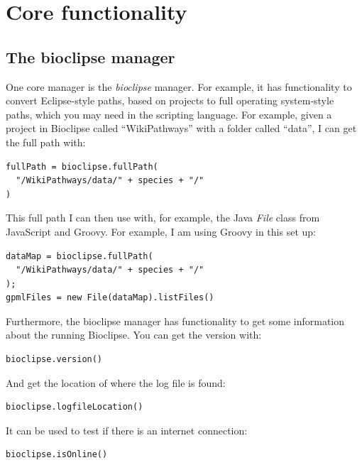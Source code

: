 \documentclass{book}
\begin{document}
\chapter{Core functionality}
\begin{refsection}

\section{The bioclipse manager}

One core manager is the \emph{bioclipse} manager. 
For example, it has functionality to convert Eclipse-style paths, based
on projects to full operating system-style paths, which you may
need in the scripting language. For example, given a project in
Bioclipse called ``WikiPathways'' with a folder called ``data'', I
can get the full path with:

\begin{Verbatim}
fullPath = bioclipse.fullPath(
  "/WikiPathways/data/" + species + "/"
)
\end{Verbatim}

This full path I can then use with, for example, the Java
\emph{File} class from JavaScript and Groovy. For example,
I am using Groovy in this set up:

\begin{Verbatim}
dataMap = bioclipse.fullPath(
  "/WikiPathways/data/" + species + "/"
);
gpmlFiles = new File(dataMap).listFiles()
\end{Verbatim}

Furthermore, the bioclipse manager has functionality to get some
information about the running Bioclipse. You can get the
version with:

\begin{Verbatim}
bioclipse.version()
\end{Verbatim}

And get the location of where the log file is
found:

\begin{Verbatim}
bioclipse.logfileLocation()
\end{Verbatim}

It can be used to test if there is an internet
connection:

\begin{Verbatim}
bioclipse.isOnline()
\end{Verbatim}


\end{refsection}
\end{document}
